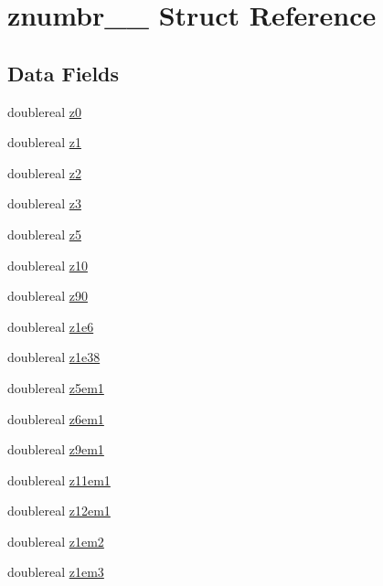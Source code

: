 \hypertarget{structznumbr__1__}{}\section{znumbr\+\_\+\_\+ Struct Reference}
\label{structznumbr__1__}
\subsection*{Data Fields}
\begin{DoxyCompactItemize}
\item 
doublereal \hyperlink{structznumbr__1___a5e4bbb5461e3c60cccd1e626da8691c0}{z0}
\item 
doublereal \hyperlink{structznumbr__1___a181e31396b67fb3cecfaab10992b1478}{z1}
\item 
doublereal \hyperlink{structznumbr__1___aee28fd1dd7ff70cc6488cd683235bb1c}{z2}
\item 
doublereal \hyperlink{structznumbr__1___a2aa74464a6f57ce24148b804051e0465}{z3}
\item 
doublereal \hyperlink{structznumbr__1___aa490154afd464289e2339168a502e476}{z5}
\item 
doublereal \hyperlink{structznumbr__1___a070ec0b04ea56c1ab3b6e41a7f8ea190}{z10}
\item 
doublereal \hyperlink{structznumbr__1___a7ee4ceeb04b142d34f799b0e096ccdf9}{z90}
\item 
doublereal \hyperlink{structznumbr__1___a9146191471810501becf0917b6780ba4}{z1e6}
\item 
doublereal \hyperlink{structznumbr__1___ab937e4448021b398707fbb2974195793}{z1e38}
\item 
doublereal \hyperlink{structznumbr__1___a452fc3e9d17760ceed1497fc42a4fa33}{z5em1}
\item 
doublereal \hyperlink{structznumbr__1___a6fe1518e8616aaade951af3080e07086}{z6em1}
\item 
doublereal \hyperlink{structznumbr__1___a40528db2b009a5a31b48761b76975eaa}{z9em1}
\item 
doublereal \hyperlink{structznumbr__1___aedfe3b1a975295602fdab4b9a11e6bd1}{z11em1}
\item 
doublereal \hyperlink{structznumbr__1___ab175693663fe459a2d9794a40e1474d1}{z12em1}
\item 
doublereal \hyperlink{structznumbr__1___a0756e0657a632811278480411a90a7bf}{z1em2}
\item 
doublereal \hyperlink{structznumbr__1___a8b724cf93058a8560a01e03d57eff0cc}{z1em3}

\end{DoxyCompactItemize}
